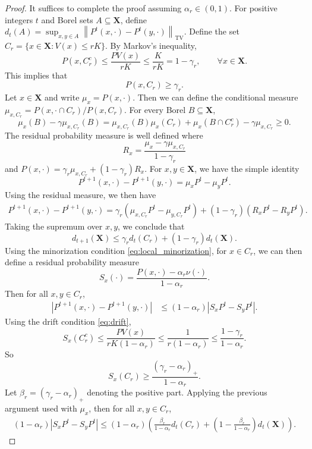 \documentclass[10pt,a4paper]{amsart}
\newcommand{\X}{\textbf{X}}
\newcommand{\norm}[1]{\left\lVert#1\right\rVert}
\renewcommand{\P}{P}
\begin{document}
\begin{proof}
It suffices to complete the proof assuming $\alpha_r \in (0, 1)$.
For positive integers $t$ and Borel sets $A \subseteq \X$, define $d_t(A) = \sup_{x, y \in A} \norm{\P^t(x, \cdot) - \P^t(y, \cdot)}_{\text{TV}}$.
Define the set $C_r = \{ x \in \X : V(x) \le  r K \}$. 
By Markov's inequality,
\[
P(x, C_r^c)
\le \frac{PV(x)}{r K}
\le \frac{K}{r K}
= 1- \gamma_r,
\qquad \forall x \in \X.
\]
This implies that 
\[
P(x, C_r) \ge \gamma_r.
\]
Let $x \in \X$ and write $\mu_x = \P(x, \cdot)$.
Then we can define the conditional measure $\mu_{x, C_r} = \P(x, \cdot \cap C_r) / \P(x, C_r)$.
For every Borel $B \subseteq \X$,
\[
\mu_x(B) - \gamma \mu_{x, C_r}(B)
= \mu_{x, C_r}(B) \mu_x(C_r) + \mu_x(B \cap C_r^c) - \gamma \mu_{x, C_r}
\ge 0.
\]
The residual probability measure is well defined where
\[
R_x = \frac{\mu_x - \gamma \mu_{x, C_r}}{1 - \gamma_r}
\]
and $\P(x, \cdot) = \gamma_r \mu_{x, C_r} + (1 - \gamma_r) R_x$.
For $x, y \in \X$, we have the simple identity
\[
\P^{t + 1}( x, \cdot ) - \P^{t + 1}( y, \cdot )
= \mu_{x} \P^{t} - \mu_{y} \P^{t}.
\]
Using the residual measure, we then have
\begin{align*}
\P^{t + 1}( x, \cdot ) - \P^{t + 1}( y, \cdot )
= \gamma_r ( \mu_{x, C_r} \P^{t} - \mu_{y, C_r} \P^{t} ) + ( 1 - \gamma_r ) ( R_x \P^{t} - R_y \P^{t} ).
\end{align*}
Taking the supremum over $x, y$, we conclude that
\[
d_{t + 1}(\X)
\le \gamma_r d_{t}(C_r) + ( 1 - \gamma_r ) d_{t}(\X).
\]
Using the minorization condition \eqref{eq:local_minorization}, for $x \in C_r$, we can then define a residual probability measure
\[
S_x(\cdot) = \frac{ \P(x, \cdot) - \alpha_r \nu(\cdot) }{ 1 - \alpha_r }.
\]
Then for all $x, y \in C_r$,
\begin{align*}
\left| \P^{t + 1}( x, \cdot ) - \P^{t + 1}( y, \cdot ) \right|
&\le ( 1 - \alpha_r ) \left| S_x \P^{t} - S_y \P^{t} \right|.
\end{align*}
Using the drift condition \eqref{eq:drift},
\[
S_x(C_r^c)
\le \frac{\P V(x)}{ r K  (1 - \alpha_r)}
\le \frac{1}{ r  (1 - \alpha_r)}
\le \frac{1 - \gamma_r}{1 - \alpha_r}.
\]
So 
\[
S_x(C_r)
\ge \frac{(\gamma_r - \alpha_r)_+}{1 - \alpha_r}.
\]
Let $\beta_r = (\gamma_r - \alpha_r)_+$ denoting the positive part.
Applying the previous argument used with $\mu_x$, then for all $x, y \in C_r$,
\begin{align*}
( 1 - \alpha_r ) \left| S_x \P^{t} - S_y \P^{t} \right|
\le ( 1 - \alpha_r ) \left( \frac{\beta_r}{1 - \alpha_r} d_{t}(C_r) + \left( 1 - \frac{\beta_r}{1 - \alpha_r} \right) d_{t}(\X) \right).

\end{align*}
\end{proof}
\end{document}
